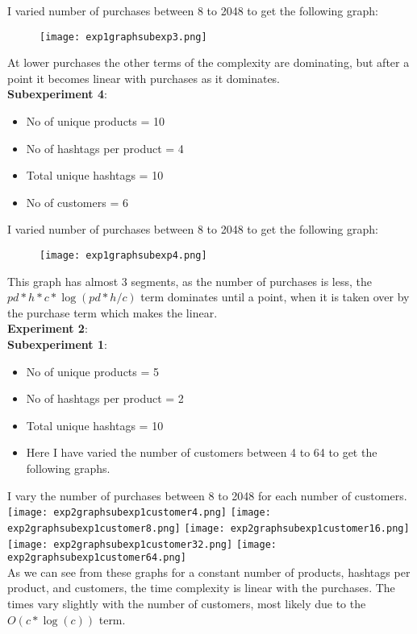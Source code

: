 \documentclass[12pt]{article}
\begin{document}
I varied number of purchases between 8 to 2048 to get the following graph:
\begin{figure}[h]
    \centering
    \texttt{[image: exp1graphsubexp3.png]}
\end{figure}
At lower purchases the other terms of the complexity are dominating, but after a point it becomes linear with purchases as it dominates.\\ \newpage
\textbf{Subexperiment 4}:\\
\begin{itemize}
    \item No of unique products = 10
    \item No of hashtags per product = 4
    \item Total unique hashtags = 10
    \item No of customers = 6
\end{itemize}
I varied number of purchases between 8 to 2048 to get the following graph:
\begin{figure}[h]
    \centering
    \texttt{[image: exp1graphsubexp4.png]}
\end{figure}
This graph has almost 3 segments, as the number of purchases is less, the $pd*h*c*\log(pd*h/c)$ term dominates until a point, when it is taken over by the purchase term which makes the linear.\\
\newpage
\textbf{Experiment 2}:\\
\textbf{Subexperiment 1}:\\
\begin{itemize}
    \item No of unique products = 5
    \item No of hashtags per product = 2
    \item Total unique hashtags = 10
    \item Here I have varied the number of customers between 4 to 64 to get the following graphs.
\end{itemize}
I vary the number of purchases between 8 to 2048 for each number of customers.\\
\texttt{[image: exp2graphsubexp1customer4.png]}
\texttt{[image: exp2graphsubexp1customer8.png]}
\texttt{[image: exp2graphsubexp1customer16.png]}
\texttt{[image: exp2graphsubexp1customer32.png]}
\texttt{[image: exp2graphsubexp1customer64.png]}\\
As we can see from these graphs for a constant number of products, hashtags per product, and customers, the time complexity is linear with the purchases. The times vary slightly with the number of customers, most likely due to the $O(c*\log(c))$ term.\\
\end{document}

